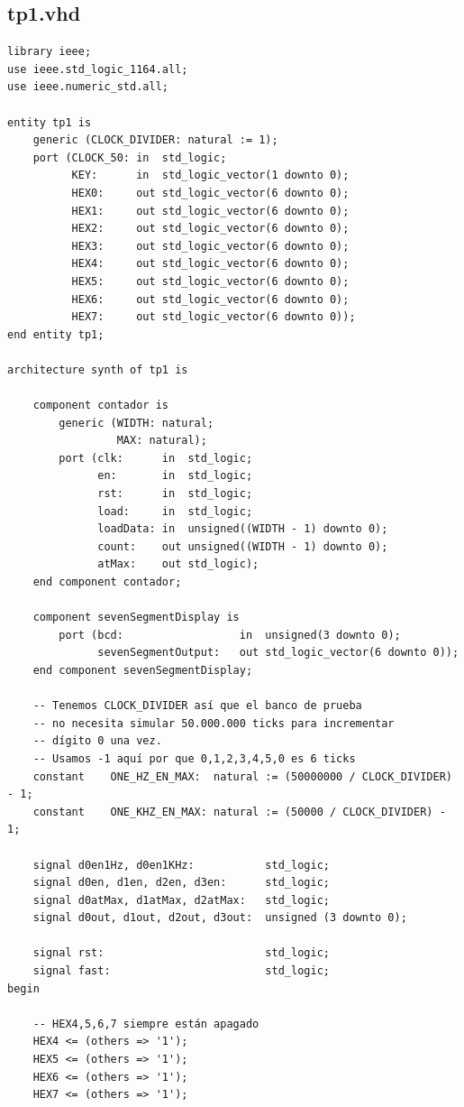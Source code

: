 \documentclass[a4paper]{article}
\begin{document}
\subsection{tp1.vhd}
\begin{verbatim}
library ieee;
use ieee.std_logic_1164.all;
use ieee.numeric_std.all;

entity tp1 is
    generic (CLOCK_DIVIDER: natural := 1);
    port (CLOCK_50: in  std_logic;
          KEY:      in  std_logic_vector(1 downto 0);
          HEX0:     out std_logic_vector(6 downto 0);
          HEX1:     out std_logic_vector(6 downto 0);
          HEX2:     out std_logic_vector(6 downto 0);
          HEX3:     out std_logic_vector(6 downto 0);
          HEX4:     out std_logic_vector(6 downto 0);
          HEX5:     out std_logic_vector(6 downto 0);
          HEX6:     out std_logic_vector(6 downto 0);
          HEX7:     out std_logic_vector(6 downto 0));
end entity tp1;

architecture synth of tp1 is

    component contador is
        generic (WIDTH: natural;
                 MAX: natural);
        port (clk:      in  std_logic;
              en:       in  std_logic;
              rst:      in  std_logic;
              load:     in  std_logic;
              loadData: in  unsigned((WIDTH - 1) downto 0);
              count:    out unsigned((WIDTH - 1) downto 0);
              atMax:    out std_logic);
    end component contador;

    component sevenSegmentDisplay is
        port (bcd:                  in  unsigned(3 downto 0);
              sevenSegmentOutput:   out std_logic_vector(6 downto 0));
    end component sevenSegmentDisplay;

    -- Tenemos CLOCK_DIVIDER así que el banco de prueba
    -- no necesita simular 50.000.000 ticks para incrementar
    -- dígito 0 una vez.
    -- Usamos -1 aquí por que 0,1,2,3,4,5,0 es 6 ticks
    constant    ONE_HZ_EN_MAX:  natural := (50000000 / CLOCK_DIVIDER) - 1;
    constant    ONE_KHZ_EN_MAX: natural := (50000 / CLOCK_DIVIDER) - 1;

    signal d0en1Hz, d0en1KHz:           std_logic;
    signal d0en, d1en, d2en, d3en:      std_logic;
    signal d0atMax, d1atMax, d2atMax:   std_logic;
    signal d0out, d1out, d2out, d3out:  unsigned (3 downto 0);

    signal rst:                         std_logic;
    signal fast:                        std_logic;
begin

    -- HEX4,5,6,7 siempre están apagado
    HEX4 <= (others => '1');
    HEX5 <= (others => '1');
    HEX6 <= (others => '1');
    HEX7 <= (others => '1');


\end{verbatim}
\end{document}
